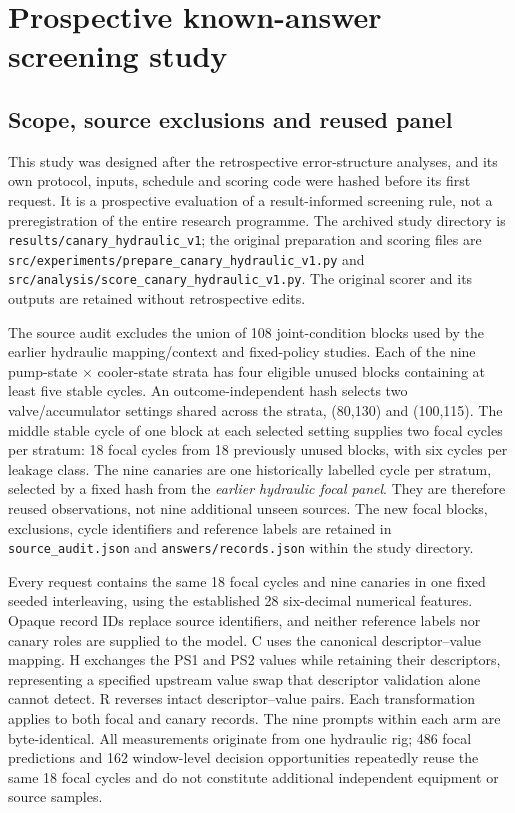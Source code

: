 \clearpage
\section{Prospective known-answer screening study}\label{app:canary_prospective}

\subsection{Scope, source exclusions and reused panel}
This study was designed after the retrospective error-structure analyses, and its own protocol, inputs, schedule and scoring code were hashed before its first request. It is a prospective evaluation of a result-informed screening rule, not a preregistration of the entire research programme. The archived study directory is \nolinkurl{results/canary_hydraulic_v1}; the original preparation and scoring files are \nolinkurl{src/experiments/prepare_canary_hydraulic_v1.py} and \nolinkurl{src/analysis/score_canary_hydraulic_v1.py}. The original scorer and its outputs are retained without retrospective edits.

The source audit excludes the union of 108 joint-condition blocks used by the earlier hydraulic mapping/context and fixed-policy studies. Each of the nine pump-state $\times$ cooler-state strata has four eligible unused blocks containing at least five stable cycles. An outcome-independent hash selects two valve/accumulator settings shared across the strata, (80,130) and (100,115). The middle stable cycle of one block at each selected setting supplies two focal cycles per stratum: 18 focal cycles from 18 previously unused blocks, with six cycles per leakage class. The nine canaries are one historically labelled cycle per stratum, selected by a fixed hash from the \emph{earlier hydraulic focal panel}. They are therefore reused observations, not nine additional unseen sources. The new focal blocks, exclusions, cycle identifiers and reference labels are retained in \nolinkurl{source_audit.json} and \nolinkurl{answers/records.json} within the study directory.

Every request contains the same 18 focal cycles and nine canaries in one fixed seeded interleaving, using the established 28 six-decimal numerical features. Opaque record IDs replace source identifiers, and neither reference labels nor canary roles are supplied to the model. C uses the canonical descriptor--value mapping. H exchanges the PS1 and PS2 values while retaining their descriptors, representing a specified upstream value swap that descriptor validation alone cannot detect. R reverses intact descriptor--value pairs. Each transformation applies to both focal and canary records. The nine prompts within each arm are byte-identical. All measurements originate from one hydraulic rig; 486 focal predictions and 162 window-level decision opportunities repeatedly reuse the same 18 focal cycles and do not constitute additional independent equipment or source samples.

